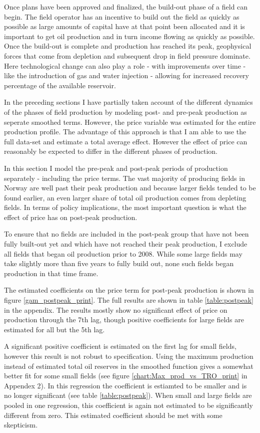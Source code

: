 \documentclass[12pt]{article}
\begin{document}
Once plans have been approved and finalized, the build-out phase of a field can begin.  The field operator has an incentive to build out the field as quickly as possible as large amounts of capital have at that point been allocated and it is important to get oil production and in turn income flowing as quickly as possible.  Once the build-out is complete and production has reached its peak, geophysical forces that come from depletion and subsequent drop in field pressure dominate.  Here technological change can also play a role - with improvements over time - like the introduction of gas and water injection - allowing for increased recovery percentage of the available reservoir. 

In the preceding sections I have partially taken account of the different dynamics of the phases of field production by modeling post- and pre-peak production as seperate smoothed terms.  However, the price variable was estimated for the entire production profile.  The advantage of this approach is that I am able to use the full data-set and estimate a total average effect.  However the effect of price can reasonably be expected to differ in the different phases of production.  

In this section I model the pre-peak and post-peak periods of production separately - including the price terms. The vast majority of producing fields in Norway are well past their peak production and because larger fields tended to be found earlier, an even larger share of total oil production comes from depleting fields.  In terms of policy implications, the most important question is what the effect of price has on post-peak production. 

To ensure that no fields are included in the post-peak group that have not been fully built-out yet and which have not reached their peak production, I exclude all fields that began oil production prior to 2008.  While some large fields may take slightly more than five years to fully build out, none such fields began production in that time frame.

 The estimated coefficients on the price term for post-peak production is shown in figure \ref{gam_postpeak_print}.  The full results are shown in table \ref{table:postpeak} in the appendix.  The results mostly show no significant effect of price on production through the 7th lag, though positive coefficients for large fields are estimated for all but the 5th lag.  

 A significant positive coefficient is estimated on the first lag for small fields, however this result is not robust to specification.  Using the maximum production instead of estimated total oil reserves in the smoothed function gives a somewhat better fit for some small fields (see figure \ref{chart:Max_prod_vs_TRO_print} in Appendex 2).  In this regression the coefficient is estiamted to be smaller and is no longer significant (see table \ref{table:postpeak}).  When small and large fields are pooled in one regression, this coefficient is again not estimated to be significantly different from zero.  This estimated coefficient should be met with some skepticism.  
\end{document}
